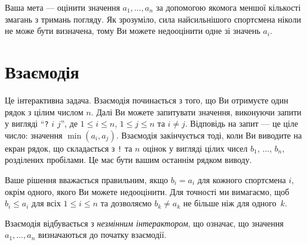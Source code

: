 Ваша мета --- оцінити значення $a_1, \ldots, a_n$ за допомогою якомога меншої кількості змагань з тримань погляду.
Як зрозуміло, сила найсильнішого спортсмена ніколи не може бути визначена, тому Ви можете недооцінити одне зі значень $a_i$.

\section*{Взаємодія}

Це інтерактивна задача.
Взаємодія починається з того, що Ви отримуєте один рядок з цілим числом $n$.
Далі Ви можете запитувати значення, виконуючи запити у вигляді ``\texttt{?} $i$ $j$'', де $1\leq i\leq n$, $1\leq j\leq n$ та $i\neq j$.
Відповідь на запит --- це ціле число: значення $\min(a_i, a_j)$.
Взаємодія закінчується тоді, коли Ви виводите на екран рядок, що складається з \texttt{!} та $n$ оцінок у вигляді цілих чисел $b_1$, $\ldots$, $b_n$, розділених пробілами.
Це має бути вашим останнім рядком виводу.

Ваше рішення вважається правильним, якщо $b_i=a_i$ для кожного спортсмена $i$, окрім одного, якого Ви можете недооцінити.
Для точності ми вимагаємо, щоб $b_i\leq a_i$ для всіх $1\leq i\leq n$ та дозволяємо $b_k \neq a_k$ не більше ніж для одного~$k$.

Взаємодія відбувається з \emph{незмінним інтерактором}, що означає, що значення $a_1, \ldots, a_n$ визначаються до початку взаємодії.

